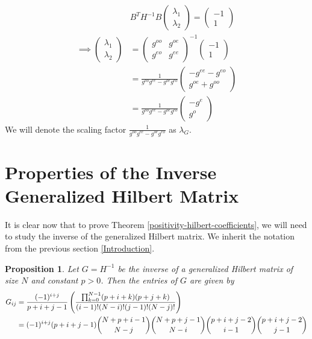 \documentclass[11pt]{article}
\newtheorem{prop}[thm]{Proposition}
\theoremstyle{definition}
\theoremstyle{remark}
\numberwithin{equation}{section}
\begin{document}
\begin{align*}
& B^T H^{-1} B \begin{pmatrix}\lambda_1 \\ \lambda_2 \end{pmatrix} = \begin{pmatrix} -1 \\ 1 \end{pmatrix}\\
\implies \begin{pmatrix} \lambda_1 \\ \lambda_2 \end{pmatrix} &= \begin{pmatrix} g^{oo} & g^{oe} \\ g^{eo} & g^{ee} \end{pmatrix}^{-1} \begin{pmatrix} -1 \\ 1 \end{pmatrix}\\
&= \frac{1}{g^{oo} g^{ee} - g^{oe}g^{eo}} \begin{pmatrix} -g^{ee} - g^{eo} \\ g^{oe} + g^{oo} \end{pmatrix}\\
&= \frac{1}{g^{oo} g^{ee} - g^{oe}g^{eo}} \begin{pmatrix} -g^e \\ g^o \end{pmatrix}
\end{align*}
We will denote the scaling factor $\frac{1}{g^{oo} g^{ee} - g^{oe}g^{eo}}$ as $\lambda_G$. 

\section{Properties of the Inverse Generalized Hilbert Matrix}\label{hilbert-matrix-properties}
It is clear now that to prove Theorem \ref{positivity-hilbert-coefficients}, we will need to study the inverse of the generalized Hilbert matrix. We inherit the notation from the previous section \ref{Introduction}. 

\begin{prop}\label{inverse-hilbert-matrix-entry}
Let $G=H^{-1}$ be the inverse of a generalized Hilbert matrix of size $N$ and constant $p>0$. Then the entries of $G$ are given by 
\begin{align}\label{entries}
 G_{ij} &= \frac{(-1)^{i+j}}{p+i+j-1} \left( \frac{\prod_{k=0}^{N-1} (p+i+k)(p+j+k)}{(i-1)! (N-i)! (j-1)! (N-j)!}\right) \\
 &= \label{entries-combinatorial-form} (-1)^{i+j} (p+i+j-1) \dbinom{N+p+i-1}{N-j} \dbinom{N+p+j-1}{N-i} \dbinom{p+i+j-2}{i-1} \dbinom{p+i+j-2}{j-1}
\end{align}
\end{prop}
\end{document}
